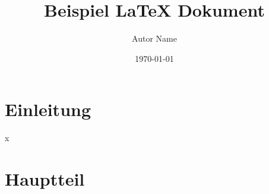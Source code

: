\documentclass{article}
\title{Beispiel LaTeX Dokument}
\author{Autor Name}
\date{\today}
\begin{document}
\maketitle

\section{Einleitung}
\lipsum[1-2] %
x
\section{Hauptteil}
\lipsum[3-4] %
\end{document}
